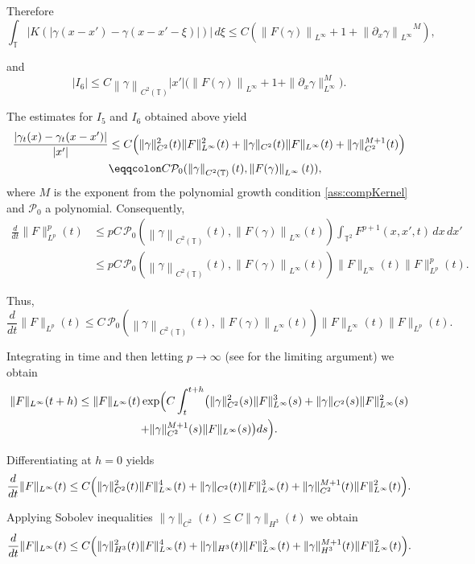 \documentclass[a4paper]{amsart}
\theoremstyle{definition}
\newcommand{\T}{\ensuremath{\mathbb{T}}}
\newcommand{\Np}[2][\infty]{\ensuremath{\left\|#2\right\|_{L^#1}}}
\newcommand{\Ck}[2][2]{\ensuremath{\left\|#2\right\|_{C^#1(\T)}}}
\newcommand{\intT}{\ensuremath{\int_\T}}
\begin{document}
    Therefore
    \begin{equation} \label{eq:controlIntKernelDif}
         \intT |K(|\gamma(x-x')-\gamma(x-x'-\xi)|)|\,d\xi \le C\left( \Np{F(\gamma)} + 1 + \Np{\partial_x\gamma}^M \right),
    \end{equation}  

   and 
   $$|I_6|\leq C \Ck{\gamma} |x'| \bigl( \Np{F(\gamma)} + 1 + \|\partial_x\gamma\|_{L^\infty}^M \bigr). $$
   
The estimates for \(I_5\) and \(I_6\) obtained above yield
\begin{align*}
\frac{|\gamma_t(x)-\gamma_t(x-x')|}{|x'|}
&\le C\Bigl( \|\gamma\|_{C^2}^2(t)\|F\|_{L^\infty}^2(t) + \|\gamma\|_{C^2}(t)\|F\|_{L^\infty}(t) + \|\gamma\|_{C^2}^{M+1}(t) \Bigr)\\
&\eqqcolon C\mathcal{P}_0(\Ck{\gamma}(t),\Np{F(\gamma)}(t)),
\end{align*}
where \(M\) is the exponent from the polynomial growth condition \ref{ass:compKernel} and $\mathcal{P}_0$ a polynomial. Consequently,
\begin{align*}
\frac{d}{dt}\|F\|_{L^p}^p(t) &\le pC\,\mathcal{P}_0(\Ck{\gamma}(t),\Np{F(\gamma)}(t)) \int_{\mathbb{T}^2} F^{p+1}(x,x',t)\,dx\,dx'\\
&\le pC\,\mathcal{P}_0(\Ck{\gamma}(t),\Np{F(\gamma)}(t))\|F\|_{L^\infty}(t)  \|F\|_{L^p}^p(t).
\end{align*}

Thus,
\[
\frac{d}{dt}\|F\|_{L^p}(t) \le C\,\mathcal{P}_0(\Ck{\gamma}(t),\Np{F(\gamma)}(t)) \|F\|_{L^\infty}(t) \|F\|_{L^p}(t).
\]

Integrating in time and then letting \(p\to\infty\) (see \cite{gancedo2008SQG} for the limiting argument) we obtain
\begin{multline*}
    \|F\|_{L^\infty}(t+h) \le \|F\|_{L^\infty}(t) \exp\Bigl( C\int_t^{t+h} \bigl( \|\gamma\|_{C^2}^2(s)\|F\|_{L^\infty}^3(s) + \|\gamma\|_{C^2}(s)\|F\|_{L^\infty}^2(s) \\+ \|\gamma\|_{C^2}^{M+1}(s)\|F\|_{L^\infty}(s) \bigr) ds \Bigr).
\end{multline*}

Differentiating at \(h=0\) yields
\[
\frac{d}{dt}\|F\|_{L^\infty}(t) \le C\Bigl( \|\gamma\|_{C^2}^2(t)\|F\|_{L^\infty}^4(t) + \|\gamma\|_{C^2}(t)\|F\|_{L^\infty}^3(t) + \|\gamma\|_{C^2}^{M+1}(t)\|F\|_{L^\infty}^2(t) \Bigr).
\]

Applying Sobolev inequalities \(\|\gamma\|_{C^2}(t)\le C\|\gamma\|_{H^3}(t)\) we obtain
\[
\frac{d}{dt}\|F\|_{L^\infty}(t) \le C\Bigl( \|\gamma\|_{H^3}^2(t)\|F\|_{L^\infty}^4(t) + \|\gamma\|_{H^3}(t)\|F\|_{L^\infty}^3(t) + \|\gamma\|_{H^3}^{M+1}(t)\|F\|_{L^\infty}^2(t) \Bigr).
\]
\end{document}

